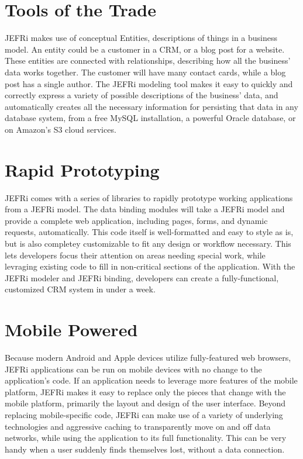 \documentclass{article}
\begin{document}
\section{Tools of the Trade}
JEFRi makes use of conceptual Entities, descriptions of things in a business
model. An entity could be a customer in a CRM, or a blog post for a website.
These entities are connected with relationships, describing how all the
business' data works together. The customer will have many contact cards, while
a blog post has a single author. The JEFRi modeling tool makes it easy to
quickly and correctly express a variety of possible descriptions of the
business' data, and automatically creates all the necessary information for
persisting that data in any database system, from a free MySQL installation, a
powerful Oracle database, or on Amazon's S3 cloud services.

\section{Rapid Prototyping}
JEFRi comes with a series of libraries to rapidly prototype working applications
from a JEFRi model. The data binding modules will take a JEFRi model and provide
a complete web application, including pages, forms, and dynamic requests,
automatically. This code itself is well-formatted and easy to style as is, but
is also completey customizable to fit any design or workflow necessary. This
lets developers focus their attention on areas needing special work, while
levraging existing code to fill in non-critical sections of the application.
With the JEFRi modeler and JEFRi binding, developers can create a
fully-functional, customized CRM system in under a week.

\section{Mobile Powered}
Because modern Android and Apple devices utilize fully-featured web browsers,
JEFRi applications can be run on mobile devices with no change to the
application's code. If an application needs to leverage more features of the
mobile platform, JEFRi makes it easy to replace only the pieces that change with
the mobile platform, primarily the layout and design of the user interface.
Beyond replacing mobile-specific code, JEFRi can make use of a variety of
underlying technologies and aggressive caching to transparently move on and off
data networks, while using the application to its full functionality. This can
be very handy when a user suddenly finds themselves lost, without a data
connection.
\end{document}
